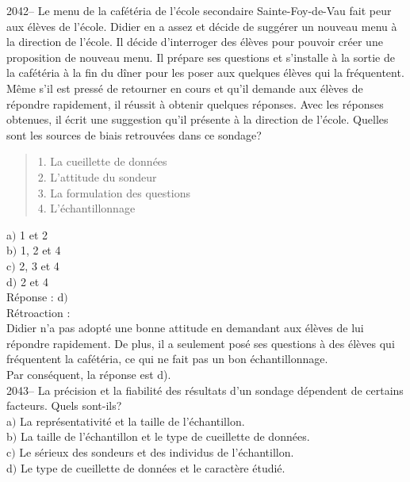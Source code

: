 \documentclass[letterpaper, 12pt]{article}
\begin{document}
2042-- Le menu de la caf\'et\'eria de l'\'ecole secondaire Sainte-Foy-de-Vau fait peur aux \'el\`eves de l'\'ecole. Didier en a assez et d\'ecide de sugg\'erer un nouveau menu \`a la direction de l'\'ecole. Il d\'ecide d'interroger des \'el\`eves pour pouvoir cr\'eer une proposition de nouveau menu. Il pr\'epare ses questions et s'installe \`a la sortie de la caf\'et\'eria \`a la fin du d\^iner pour les poser aux quelques \'el\`eves qui la fr\'equentent.  M\^eme s'il est press\'e de retourner en cours et qu'il demande aux \'el\`eves de r\'epondre rapidement, il r\'eussit \`a obtenir quelques r\'eponses. Avec les r\'eponses obtenues, il \'ecrit une suggestion qu'il pr\'esente \`a la direction de l'\'ecole. Quelles sont les sources de biais retrouv\'ees dans ce sondage? \\
\begin{quote}
1. La cueillette de donn\'ees\\
2. L'attitude du sondeur\\
3. La formulation des questions\\
4. L'\'echantillonnage\\
\end{quote}


a$)$ 1 et 2 \\
b$)$ 1, 2 et 4 \\
c$)$ 2, 3 et 4 \\
d$)$ 2 et 4 \\


R\'eponse : d$)$\\

R\'etroaction :\\
Didier n'a pas adopt\'e une bonne attitude en demandant aux \'el\`eves de lui r\'epondre rapidement. De plus, il a seulement pos\'e ses questions \`a des \'el\`eves qui fr\'equentent la caf\'et\'eria, ce qui ne fait pas un bon \'echantillonnage. \\
Par cons\'equent, la r\'eponse est d).\\

2043-- La pr\'ecision et la fiabilit\'e des r\'esultats d'un sondage d\'ependent de certains facteurs. Quels sont-ils? \\

a$)$ La repr\'esentativit\'e et la taille de l'\'echantillon. \\
b$)$ La taille de l'\'echantillon et le type de cueillette de donn\'ees. \\
c$)$ Le s\'erieux des sondeurs et des individus de l'\'echantillon. \\
d$)$ Le type de cueillette de donn\'ees et le caract\`ere \'etudi\'e. \\
\end{document}
